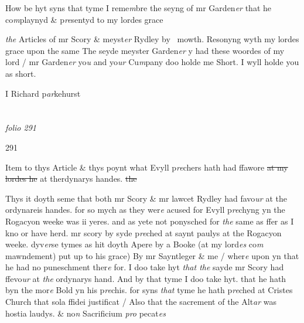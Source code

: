 \documentclass[12pt, a4paper]{book}
\begin{document}
		
			
 	
		\ifthenelse{\isodd{\thepage}}
		{\reversemarginpar}
		{\normalmarginpar}
		How be hyt syns that tyme I reme\textit{m}bre the seyng of mr Garden\textit{er} that he 
 co\textit{m}playnyd \& p\textit{re}sentyd to my lordes grace 
			
               \textit{the} Articles of mr Scory \& meyst\textit{er} Rydley by 
mowth. Resonyng wyth my lordes grace  upon the same The seyde meyster
Garden\textit{er}
               y
			 had these woordes of my lord / mr Garden\textit{er} yo\textit{u} and yo\textit{ur} Cu\textit{m}pany doo
holde me Short. I wyll holde you as short.

		\ifthenelse{\isodd{\thepage}}
		{\reversemarginpar}
		{\normalmarginpar}
		I Richard p\textit{ar}kehurst

\dotfill
						\newpage {} \section*{}  \subsection*{}

\textit{folio 291}



            		\begin{flushright}{\color{Mahogany}291}\end{flushright}


		\ifthenelse{\isodd{\thepage}}
		{\reversemarginpar}
		{\normalmarginpar}
		Item to thys Article \& thys poynt what Evyll p\textit{re}chers hath had ffawore \sout{at 
my lordes he} at therdynarys handes. \sout{the}

		\ifthenelse{\isodd{\thepage}}
		{\reversemarginpar}
		{\normalmarginpar}
		Thys it doyth seme that both mr Scory \& mr lawcet Rydley had favo\textit{ur}
at the ordynareis handes. for so mych as they wer\textit{e} acused for Evyll p\textit{re}chyng
yn the Rogacyon weeke was ii yeres. and as yete not ponysched for \textit{the} same as
ffer as I kno or have herd. mr scory by syde p\textit{re}ched at saynt paulys at the
Rogacyon weeke. dyv\textit{er}se tymes as hit doyth Apere by a Booke (at my lord\textit{es} co\textit{m}
mawndement) put up to his grace) By mr Sayntleger \& me / wher\textit{e} upon
yn that he had no puneschment ther\textit{e} for. I doo take hyt \textit{that the} sayde mr Scory
had ffevo\textit{ur} at \textit{the} ordynarys hand. And by that tyme I doo take hyt. that he
hath byn the mor\textit{e} Bold yn his p\textit{re}chis. for syns \textit{that} tyme he hath p\textit{re}ched at Cristes
Church that sola ffidei justificat / Also that the sacrement of the Alt\textit{ar}
was hostia laudys. \& no\textit{n} Sacrificium \textit{pro} pecat\textit{es}
\end{document}
